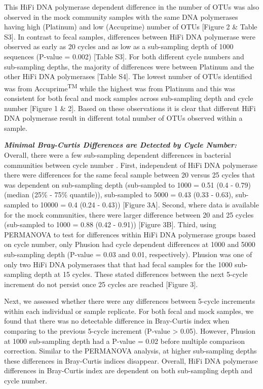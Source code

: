 \documentclass[12pt,]{article}
\begin{document}
This HiFi DNA polymerase dependent difference in the number of OTUs was
also observed in the mock community samples with the same DNA
polymerases having high (Platinum) and low (Accuprime) number of OTUs
{[}Figure 2 \& Table S3{]}. In contrast to fecal samples, differences
between HiFi DNA polymerase were observed as early as 20 cycles and as
low as a sub-sampling depth of 1000 sequences (P-value = 0.002) {[}Table
S3{]}. For both different cycle numbers and sub-sampling depths, the
majority of differences were between Platinum and the other HiFi DNA
polymerases {[}Table S4{]}. The lowest number of OTUs identified was
from Accuprime\textsuperscript{TM} while the highest was from Platinum
and this was consistent for both fecal and mock samples across
sub-sampling depth and cycle number {[}Figure 1 \& 2{]}. Based on these
observations it is clear that different HiFi DNA polymerase result in
different total number of OTUs observed within a sample.

\textbf{\emph{Minimal Bray-Curtis Differences are Detected by Cycle
Number:}} Overall, there were a few sub-sampling dependent differences
in bacterial communities between cycle number . First, independent of
HiFi DNA polymerase there were differences for the same fecal sample
between 20 versus 25 cycles that was dependent on sub-sampling depth
(sub-sampled to 1000 = 0.51 (0.4 - 0.79) (median (25\% - 75\%
quantile)), sub-sampled to 5000 = 0.43 (0.33 - 0.63), sub-sampled to
10000 = 0.4 (0.24 - 0.43)) {[}Figure 3A{]}. Second, where data is
available for the mock communities, there were larger difference between
20 and 25 cycles (sub-sampled to 1000 = 0.88 (0.42 - 0.91)) {[}Figure
3B{]}. Third, using PERMANOVA to test for differences within HiFi DNA
polymerase groups based on cycle number, only Phusion had cycle
dependent differences at 1000 and 5000 sub-sampling depth (P-value =
0.03 and 0.01, respectively). Phusion was one of only two HiFi DNA
polymerases that that had fecal samples for the 1000 sub-sampling depth
at 15 cycles. These stated differences between the next 5-cycle
increment do not persist once 25 cycles are reached {[}Figure 3{]}.

Next, we assessed whether there were any differences between 5-cycle
increments within each individual or sample replicate. For both fecal
and mock samples, we found that there was no detectable difference in
Bray-Curtis index when comparing to the previous 5-cycle increment
(P-value \textgreater{} 0.05). However, Phusion at 1000 sub-sampling
depth had a P-value = 0.02 before multiple comparison correction.
Similar to the PERMANOVA analysis, at higher sub-sampling depths these
differences in Bray-Curtis indices disappear. Overall, HiFi DNA
polymerase differences in Bray-Curtis index are dependent on both
sub-sampling depth and cycle number.
\end{document}
